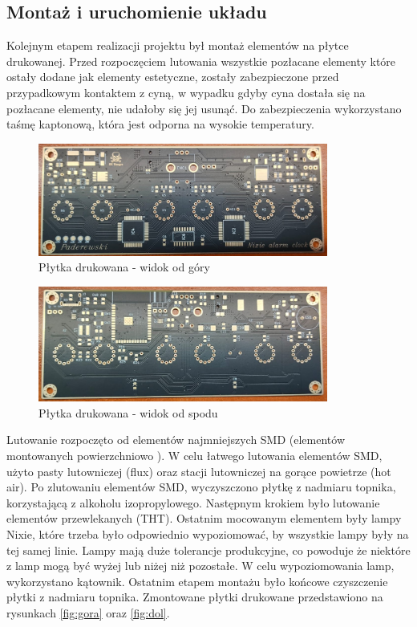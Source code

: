 \documentclass[../main.tex]{subfiles}
\begin{document}
\subsection{Montaż i uruchomienie układu}
Kolejnym etapem realizacji projektu był montaż elementów na płytce drukowanej.
Przed rozpoczęciem lutowania wszystkie pozłacane elementy
które ostały dodane jak elementy estetyczne, zostały zabezpieczone przed przypadkowym kontaktem z cyną, w wypadku gdyby cyna dostała się
na pozłacane elementy, nie udałoby się jej usunąć. Do zabezpieczenia wykorzystano taśmę kaptonową, która jest odporna na wysokie temperatury.

\begin{figure}[H]
    \centering
    \includegraphics[width=0.85\textwidth]{przod.jpeg}
    \caption{Płytka drukowana - widok od góry}
    \label{fig:plytka_drukowana_1}
\end{figure}

\begin{figure}[H]
    \centering
    \includegraphics[width=0.85\textwidth]{tyl.jpeg}
    \caption{Płytka drukowana - widok od spodu}
    \label{fig:plytka_drukowana_2}
\end{figure}


Lutowanie rozpoczęto od elementów najmniejszych SMD (elementów montowanych powierzchniowo ). W celu łatwego lutowania elementów SMD, użyto pasty lutowniczej (flux)
oraz stacji lutowniczej na gorące powietrze (hot air). Po zlutowaniu elementów SMD, wyczyszczono płytkę z nadmiaru topnika, korzystającą z alkoholu izopropylowego. Następnym
krokiem było lutowanie elementów przewlekanych (THT). Ostatnim  mocowanym elementem były lampy Nixie, które trzeba było odpowiednio wypoziomować, by wszystkie lampy
były na tej samej linie. Lampy mają duże tolerancje produkcyjne, co powoduje że niektóre z lamp mogą być wyżej lub niżej niż pozostałe. W celu wypoziomowania lamp,
wykorzystano kątownik. Ostatnim etapem montażu było końcowe czyszczenie płytki z nadmiaru topnika. Zmontowane płytki drukowane przedstawiono na rysunkach \ref{fig:gora} oraz \ref{fig:dol}.
\end{document}
